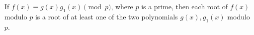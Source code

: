 If $f(x) \equiv g(x) g_1(x) \pmod{p}$, where $p$ is a prime, then each root of $f(x)$ modulo $p$ is a root of at least one of the two polynomials $g(x), g_1(x)$ modulo $p$.
